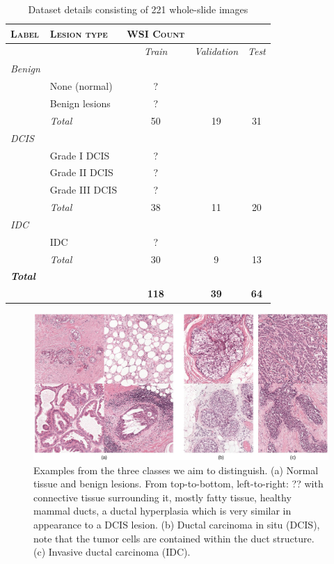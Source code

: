 \documentclass[journal]{IEEEtran}
\begin{document}
\begin{table}[!t]
\renewcommand{\arraystretch}{1.05}
\caption{Dataset details consisting of 221 whole-slide images}
\label{table_dataset}
\centering
\begin{tabular}{|llccc|}
\hline
\textsc{Label}&\textsc{Lesion type}&\hspace{-0.4cm}\textsc{WSI Count}&&\\
\hline
&&\textit{Train}&\hspace{-0.24cm}\textit{Validation}&\textit{Test}\\
\textit{Benign}&&&&\\
&None (normal)& ?&&\\
&Benign lesions& ? &&\\
&\textit{Total}& 50&19&31\\

\textit{DCIS}&&&&\\
&Grade I DCIS&  ?&&\\
&Grade II DCIS& ?&&\\
&Grade III DCIS& ?&&\\
&\textit{Total}& 38&11&20\\
\textit{IDC}&&&&\\
&IDC& ?&&\\
&\textit{Total}& 30&9&13\\


\textit{\textbf{Total}}&&&&\\
&&\textbf{118}&\textbf{39}&\textbf{64}\\
\hline
\end{tabular}
\end{table}



\begin{figure}[!t]
\centering
\hspace{0.1cm}\includegraphics[width=7in]{lesion_examples}%
\caption{Examples from the three classes we aim to distinguish. (a) Normal tissue and benign lesions. From top-to-bottom, left-to-right: ?? with connective tissue surrounding it, mostly fatty tissue, healthy mammal ducts, a ductal hyperplasia which is very similar in appearance to a DCIS lesion. (b) Ductal carcinoma in situ (DCIS), note that the tumor cells are contained within the duct structure. (c) Invasive ductal carcinoma (IDC).}
\label{fig_lesion_examples}
\end{figure}
\end{document}
